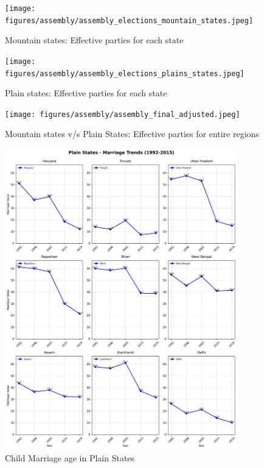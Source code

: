 \begin{figure}[htbp]
    \centering
    \texttt{[image: figures/assembly/assembly\_elections\_mountain\_states.jpeg]}
    \caption{Mountain states: Effective parties for each state}
    \label{img:assembly_mountain_enp}
\end{figure}

\begin{figure}[htbp]
    \centering
    \texttt{[image: figures/assembly/assembly\_elections\_plains\_states.jpeg]}
    \caption{Plain states: Effective parties for each state}
    \label{img:assembly_plain_enp}
\end{figure}

\begin{figure}[htbp]
    \centering
    \texttt{[image: figures/assembly/assembly\_final\_adjusted.jpeg]}
    \caption{Mountain states v/s Plain States: Effective parties for entire regions}
    \label{img:assembly_overall_enp}
\end{figure}

\begin{figure}[H]
    \centering
    \includegraphics[width=0.9\textwidth, bb=0 0 800 800, clip]{figures/nfhs/plain_states_marriage_subplots.jpeg}
    \caption{Child Marriage age in Plain States}
    \label{fig:nfhs_plain_marriage}
\end{figure}

